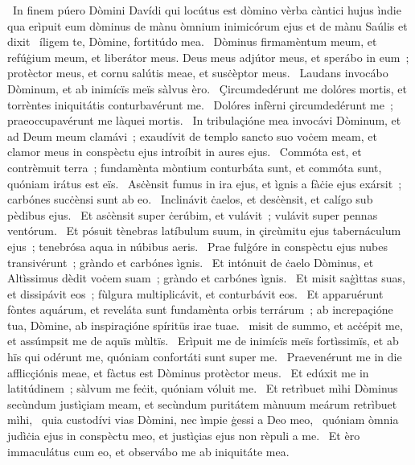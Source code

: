 {~In finem púero Dòmini Davídi qui locútus est dòmino vèrba càntici hujus ìndie qua erìpuit eum dòminus de mànu òmnium inimicórum ejus et de mànu Saúlis et dixit}
{%
~íligem te, Dòmine, fortitúdo mea.
~Dòminus firmamèntum meum, et refúġium meum, et liberátor meus. Deus meus adjútor meus, et sperábo in eum~; protèctor meus, et cornu salútis meae, et susċèptor meus.
~Laudans invocábo Dòminum, et ab inimícïs meïs sàlvus èro.
~Çircumdedérunt me dolóres mortis, et torrèntes iniquitátis conturbavérunt me.
~Dolóres infèrni çircumdedérunt me~; praeoccupavérunt me làquei mortis.
~In tribulaçióne mea invocávi Dòminum, et ad Deum meum clamávi~; exaudívit de templo sancto suo voċem meam, et clamor meus in conspèctu ejus introíbit in aures ejus.
~Commóta est, et contrèmuit terra~; fundamènta mòntium conturbáta sunt, et commóta sunt, quóniam irátus est eïs.
~Asċènsit fumus in ira ejus, et ìgnis a fàċie ejus exársit~; carbónes sucċènsi sunt ab eo.
~Inclinávit ċaelos, et desċènsit, et calígo sub pèdibus ejus.
~Et asċènsit super ċerúbim, et vulávit~; vulávit super pennas ventórum.
~Et pósuit tènebras latíbulum suum, in çircùmitu ejus tabernáculum ejus~; tenebrósa aqua in núbibus aeris.
~Prae fulġóre in conspèctu ejus nubes transivérunt~; gràndo et carbónes ìgnis.
~Et intónuit de ċaelo Dòminus, et Altìssimus dèdit voċem suam~; gràndo et carbónes ìgnis.
~Et misit saġìttas suas, et dissipávit eos~; fùlgura multiplicávit, et conturbávit eos.
~Et apparuérunt fòntes aquárum, et reveláta sunt fundamènta orbis terrárum~; ab increpaçióne tua, Dòmine, ab inspiraçióne spíritüs irae tuae.
~misit de summo, et acċépit me, et assúmpsit me de aquïs mùltïs.
~Erìpuit me de inimícïs meïs fortìssimïs, et ab hïs qui odérunt me, quóniam confortáti sunt super me.
~Praevenérunt me in die afflicçiónis meae, et fàctus est Dòminus protèctor meus.
~Et edúxit me in latitúdinem~; sàlvum me feċit, quóniam vóluit me.
~Et retrìbuet mìhi Dòminus secùndum justìçiam meam, et secùndum puritátem mànuum meárum retrìbuet mìhi,
~quia custodívi vias Dòmini, nec ìmpie ġessi a Deo meo,
~quóniam òmnia judìċia ejus in conspèctu meo, et justìçias ejus non rèpuli a me.
~Et èro immaculátus cum eo, et observábo me ab iniquitáte mea.
}
